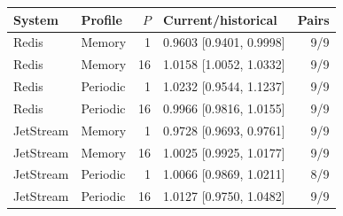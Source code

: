 \begin{tabular}{llrlr}
\toprule
System & Profile & $P$ & Current/historical & Pairs\\
\midrule
Redis & Memory & 1 & 0.9603 [0.9401, 0.9998] & 9/9\\
Redis & Memory & 16 & 1.0158 [1.0052, 1.0332] & 9/9\\
Redis & Periodic & 1 & 1.0232 [0.9544, 1.1237] & 9/9\\
Redis & Periodic & 16 & 0.9966 [0.9816, 1.0155] & 9/9\\
JetStream & Memory & 1 & 0.9728 [0.9693, 0.9761] & 9/9\\
JetStream & Memory & 16 & 1.0025 [0.9925, 1.0177] & 9/9\\
JetStream & Periodic & 1 & 1.0066 [0.9869, 1.0211] & 8/9\\
JetStream & Periodic & 16 & 1.0127 [0.9750, 1.0482] & 9/9\\
\bottomrule
\end{tabular}
